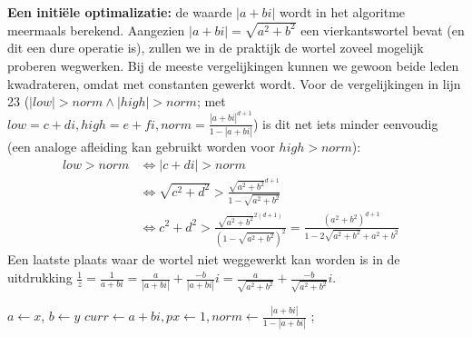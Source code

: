 \documentclass{article}
\begin{document}
\textbf{Een initi\"ele optimalizatie: } de waarde $\left|a+bi\right|$ wordt in het algoritme meermaals berekend. Aangezien $\left|a+bi\right| = \sqrt{a^2 + b^2}$ een vierkantswortel bevat (en dit een dure operatie is), zullen we in de praktijk de wortel zoveel mogelijk proberen wegwerken. Bij de meeste vergelijkingen kunnen we gewoon beide leden kwadrateren, omdat met constanten gewerkt wordt. Voor de vergelijkingen in lijn 23 ($\left|low\right| > norm \land \left|high\right| > norm$; met $low = c+di, high = e+fi, norm = \frac{\left|a+bi\right|^{d+1}}{1 - \left|a+bi\right|}$) is dit net iets minder eenvoudig (een analoge afleiding kan gebruikt worden voor $high > norm$):
\begin{align*}
 low > norm &\iff \left|c+di\right| > norm \\
 &\iff \sqrt{c^2 + d^2} > \frac{\sqrt{a^2 + b^2}^{d+1}}{1 - \sqrt{a^2 + b^2}} & \\
 &\iff c^2 + d^2 > \frac{\sqrt{a^2 + b^2}^{2(d+1)}}{\left(1 - \sqrt{a^2 + b^2}\right)^2} = \frac{\left(a^2 + b^2\right)^{d+1}}{1 - 2\sqrt{a^2 + b^2} + a^2 + b^2}
\end{align*}
Een laatste plaats waar de wortel niet weggewerkt kan worden is in de uitdrukking $\frac{1}{z} = \frac{1}{a+bi} = \frac{a}{\left|a+bi\right|} + \frac{-b}{\left|a+bi\right|}i = \frac{a}{\sqrt{a^2 + b^2}} + \frac{-b}{\sqrt{a^2 + b^2}}i$.

\begin{algorithm}
 $a \gets x$, $b \gets y$\;
 $curr \gets a + bi, px \gets 1, norm \gets \frac{\left|a + bi\right|}{1 - \left|a + bi\right|}$\;
 ; 
 \caption{$isSolution(x, y)$}
\end{algorithm}
\end{document}
